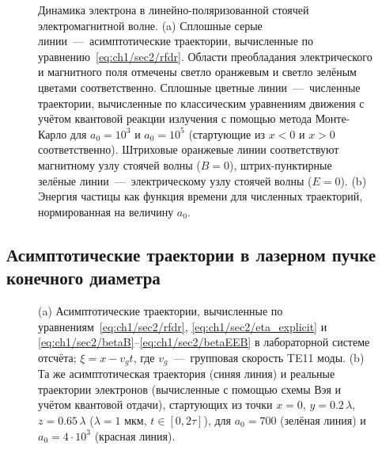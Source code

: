 \begin{figure}[ht]
    \caption[Динамика электрона в линейно-поляризованной стоячей электромагнитной волне]{Динамика электрона в линейно-поляризованной стоячей электромагнитной волне. (a) Сплошные серые линии~---~асимптотические траектории, вычисленные по уравнению~\eqref{eq:ch1/sec2/rfdr}. Области преобладания электрического и магнитного поля отмечены светло оранжевым и светло зелёным цветами соответственно. Сплошные цветные линии~---~численные траектории, вычисленные по классическим уравнениям движения с учётом квантовой реакции излучения с помощью метода Монте-Карло для $a_0 = 10^3$ и $a_0 = 10^5$ (стартующие из $x < 0$ и $x > 0$ соответственно). Штриховые оранжевые линии соответствуют магнитному узлу стоячей волны ($B = 0$), штрих-пунктирные зелёные линии~---~электрическому узлу стоячей волны ($E=0$).
    (b) Энергия частицы как функция времени для численных траекторий, нормированная на величину $a_0$.}
    \label{fig:ch1/sec3/onion}
\end{figure}


\subsection{Асимптотические траектории в лазерном пучке конечного диаметра}
\label{TE11}

\begin{figure}[ht]
    \caption[Динамика электрона в поле ТЕ11 моды прямоугольного волновода]{\label{fig:ch1/sec3/te11}
    (a) Асимптотические траектории, вычисленные по уравнениям~\eqref{eq:ch1/sec2/rfdr}, \eqref{eq:ch1/sec2/eta_explicit} и
    \eqref{eq:ch1/sec2/betaB}--\eqref{eq:ch1/sec2/betaEEB} в лабораторной системе отсчёта; $\xi = x - v_g t$, где
    $v_g$~---~групповая скорость TE11 моды.
    (b) Та же асимптотическая траектория (синяя линия) и реальные траектории электронов (вычисленные с помощью схемы Вэя и учётом квантовой отдачи), стартующих из точки $x = 0$, $y = 0.2 \, \lambda$, $z = 0.65 \, \lambda$ ($\lambda = 1$ мкм, $t \in [0, 2 \tau]$), для $a_0 = 700$ (зелёная линия) и $a_0 = 4 \cdot 10^3$ (красная линия).}
\end{figure}

